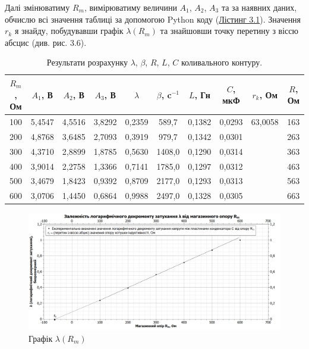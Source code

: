 \documentclass[12pt,a4paper]{article}
\begin{document}
    \vspace{1em} %
    \setlength{\parindent}{1.5em}

    Далі змінюватиму $R_m$, вимірюватиму величини $A_1$, $A_2$, $A_3$ та за наявних даних, обчислю всі значення таблиці за допомогою Python коду (\hyperlink{listing1}{Лістинг 3.1}).
    Значення $r_k$ я знайду, побудувавши графік $\lambda(R_m)$ та знайшовши точку перетину з віссю абсцис (див. рис. 3.6).

    \begin{table}[h!]
        \centering
        \renewcommand{\arraystretch}{1.2} %
        \begin{tabular}{|c|c|c|c|c|c|c|c|c|c|}
            \hline
            $R_m$, Ом & $A_1$, В & $A_2$, В & $A_3$, В & $\lambda$ & $\beta$, c$^{-1}$ & $L$, Гн & $C$, мкФ & $r_k$, Ом & $R$, Ом \\[3pt]
            \hline
            100 & 5,4547 & 4,5516 & 3,8292 & 0,2359 & 589,7 & 0,1382 & 0,0293 & 63,0058 & 163 \\[3pt]
            200 & 4,8768 & 3,6485 & 2,7093 & 0,3919 & 979,7 & 0,1342 & 0,0301 & & 263 \\[3pt]
            300 & 4,3710 & 2,8899 & 1,8785 & 0,5630 & 1408,0 & 0,1290 & 0,0314 & & 363 \\[3pt]
            400 & 3,9014 & 2,2758 & 1,3366 & 0,7141 & 1785,0 & 0,1297 & 0,0312 & & 463 \\[3pt]
            500 & 3,4679 & 1,8423 & 0,9392 & 0,8709 & 2177,0 & 0,1293 & 0,0313 & & 563 \\[3pt]
            600 & 3,0706 & 1,4450 & 0,6864 & 0,9988 & 2497,0 & 0,1328 & 0,0305 & & 663 \\[3pt]
            \hline
        \end{tabular}
        \caption{Результати розрахунку $\lambda$, $\beta$, $R$, $L$, $C$ коливального контуру.}
    \end{table}

    \begin{figure}[h!]

        \renewcommand{\thefigure}{3.\arabic{figure}} %

        \centering
        \includegraphics[width=1.00\textwidth]{graph.png}
        \caption{Графік $\lambda(R_m)$}
        \label{graph:schema}

    \end{figure}
\end{document}
